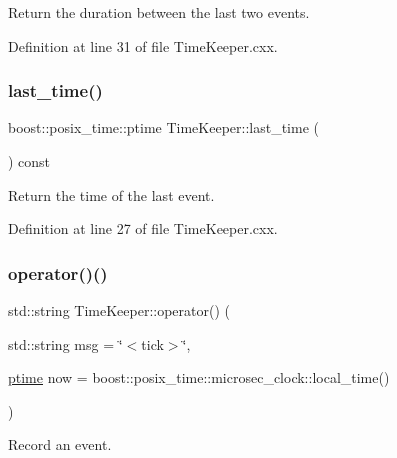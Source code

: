 Return the duration between the last two events. 



Definition at line 31 of file Time\+Keeper.\+cxx.

\mbox{\label{class_wire_cell_1_1_time_keeper_a58d3645d65f01238a44978122f388ddc}} 
\subsubsection{\texorpdfstring{last\+\_\+time()}{last\_time()}}
{\footnotesize\ttfamily boost\+::posix\+\_\+time\+::ptime Time\+Keeper\+::last\+\_\+time (\begin{DoxyParamCaption}{ }\end{DoxyParamCaption}) const}



Return the time of the last event. 



Definition at line 27 of file Time\+Keeper.\+cxx.

\mbox{\label{class_wire_cell_1_1_time_keeper_a7f27087fcc02a6b5fea15702a83b40c2}} 
\subsubsection{\texorpdfstring{operator()()}{operator()()}}
{\footnotesize\ttfamily std\+::string Time\+Keeper\+::operator() (\begin{DoxyParamCaption}\item[{std\+::string}]{msg = {\ttfamily \char`\"{}$<$tick$>$\char`\"{}},  }\item[{\hyperlink{class_wire_cell_1_1_time_keeper_a3600404e97a1581a1c2630f92f490603}{ptime}}]{now = {\ttfamily boost\+:\+:posix\+\_\+time\+:\+:microsec\+\_\+clock\+:\+:local\+\_\+time()} }\end{DoxyParamCaption})}



Record an event. 



